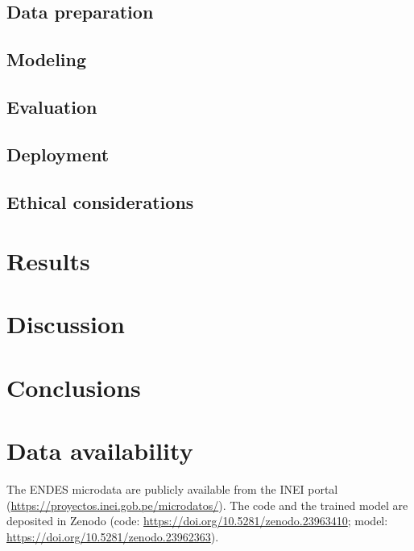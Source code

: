 \documentclass[preprint,12pt]{elsarticle}   %
\begin{document}
\subsection{Data preparation}
\subsection{Modeling}
\subsection{Evaluation}
\subsection{Deployment}
\subsection{Ethical considerations}

\section{Results}

\section{Discussion}

\section{Conclusions}



\section*{Data availability}
The ENDES microdata are publicly available from the INEI portal (\url{https://proyectos.inei.gob.pe/microdatos/}).
The code and the trained model are deposited in Zenodo (code: \url{https://doi.org/10.5281/zenodo.23963410};
model: \url{https://doi.org/10.5281/zenodo.23962363}).
\end{document}
